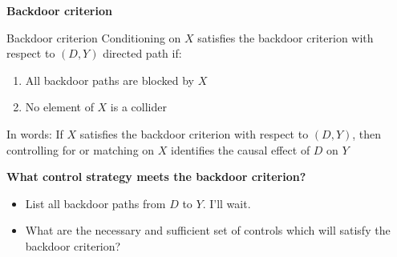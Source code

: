 \documentclass[notes=show]{beamer}
\begin{document}
\begin{frame}[plain]

	\begin{center}
	\textbf{Backdoor criterion}
	\end{center}
	

		\begin{block}{Backdoor criterion}
		Conditioning on $X$ satisfies the backdoor criterion with respect to $(D,Y)$ directed path if:
		\begin{enumerate}
			\item All backdoor paths are blocked by $X$
			\item No element of $X$ is a collider 
		\end{enumerate}

		In words: If $X$ satisfies the backdoor criterion with respect to $(D,Y)$, then controlling for or matching on $X$ identifies the causal effect of $D$ on $Y$
		\end{block}
\end{frame}

\begin{frame}[plain]
\begin{center}
\textbf{What control strategy meets the backdoor criterion?}
\end{center}
		\begin{itemize}
			\item List all backdoor paths from $D$ to $Y$. I'll wait.

			\begin{center}
			\end{center}

			\item What are the necessary and sufficient set of controls which will satisfy the backdoor criterion?
		\end{itemize}
		
		\framebreak
		



\end{frame}
\end{document}
